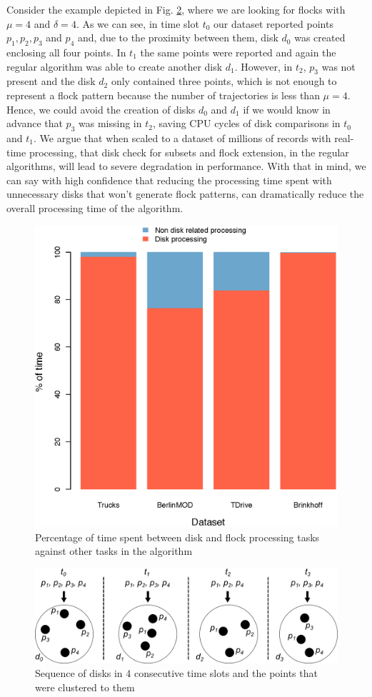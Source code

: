 Consider the example depicted in Fig. \ref{fig:disks}, where we are looking for flocks with $\mu=4$ and $\delta=4$. As
we can see, in time slot $t_0$ our dataset reported points $p_1,p_2,p_3$ and $p_4$ and, due to the proximity between
them, disk $d_0$ was created enclosing all four points. In $t_1$ the same points were reported and again the regular
algorithm was able to create another disk $d_1$. However, in $t_2$, $p_3$ was not present and the disk $d_2$ only
contained three points, which is not enough to represent a flock pattern because the number of trajectories is less than
$\mu = 4$. Hence, we could avoid the creation of disks $d_0$ and $d_1$ if we would know in advance that $p_3$ was
missing in $t_2$, saving CPU cycles of disk comparisons in $t_0$ and $t_1$. We argue that when scaled to a dataset of
millions of records with real-time processing, that disk check for subsets and flock extension, in the regular
algorithms, will lead to severe degradation in performance. With that in mind, we can say with high confidence that
reducing the processing time spent with unnecessary disks that won't generate flock patterns, can dramatically reduce
the overall processing time of the algorithm.

\begin{figure}[h!]
    \centering
    \includegraphics[width=0.7\linewidth]{images/timeConsumption.eps}
    \caption{Percentage of time spent between disk and flock processing tasks against other tasks in the algorithm}
    \label{fig:time_consumption}
\end{figure}

\begin{figure}[h!]
    \centering
    \includegraphics[width=\linewidth]{images/disks_2.png}
    \caption{Sequence of disks in 4 consecutive time slots and the points that were clustered to them}
    \label{fig:disks}
\end{figure}

